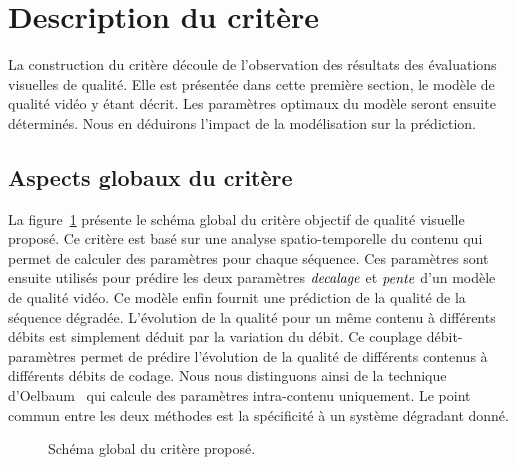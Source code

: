 \section{Description du critère}
La construction du critère découle de l'observation des résultats des évaluations visuelles de qualité. Elle est présentée dans cette première section, le modèle de qualité vidéo y étant décrit. Les paramètres optimaux du modèle seront ensuite déterminés. Nous en déduirons l'impact de la modélisation sur la prédiction.

\subsection{Aspects globaux du critère}
La figure~\ref{fig:schemaMetrique1} présente le schéma global du critère objectif de qualité visuelle proposé. Ce critère est basé sur une analyse spatio-temporelle du contenu qui permet de calculer des paramètres pour chaque séquence. Ces paramètres sont ensuite utilisés pour prédire les deux paramètres $\offset{}$ et $\slope{}$ d'un modèle de qualité vidéo. Ce modèle enfin fournit une prédiction de la qualité de la séquence dégradée. L'évolution de la qualité pour un même contenu à différents débits est simplement déduit par la variation du débit. Ce couplage débit-paramètres permet de prédire l'évolution de la qualité de différents contenus à différents débits de codage. Nous nous distinguons ainsi de la technique d'Oelbaum~\cite{oelbaum-pcs2007} qui calcule des paramètres intra-contenu uniquement. Le point commun entre les deux méthodes est la spécificité à un système dégradant donné.

\begin{figure}[htbp]
\centering
\begin{tikzpicture}[node distance = 3.5cm, auto, text centered]\end{tikzpicture}
\caption{Schéma global du critère proposé.}
\label{fig:schemaMetrique1}
\end{figure}


